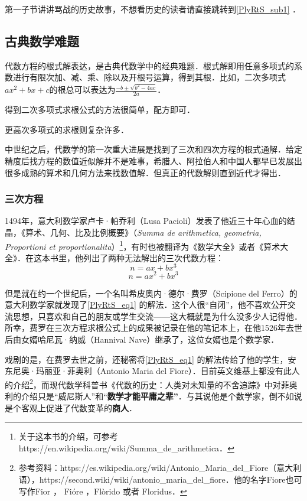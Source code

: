 


第一子节讲讲骂战的历史故事，不想看历史的读者请直接跳转到\autoref{PlyRtS_sub1} ．

\subsection{古典数学难题}

代数方程的根式解表达，是古典代数学中的经典难题．根式解即用任意多项式的系数进行有限次加、减、乘、除以及开根号运算，得到其根．比如，二次多项式$ax^2+bx+c$的根总可以表达为$\frac{-b\pm\sqrt{b^2-4ac}}{2a}$．

得到二次多项式求根公式的方法很简单，配方即可．

更高次多项式的求根则复杂许多．

中世纪之后，代数学的第一次重大进展是找到了三次和四次方程的根式通解．给定精度后找方程的数值近似解并不是难事，希腊人、阿拉伯人和中国人都早已发展出很多成熟的算术和几何方法来找数值解．但真正的代数解则直到近代才得出．

\subsubsection{三次方程}

1494年，意大利数学家卢卡·帕乔利（Lusa Pacioli）发表了他近三十年心血的结晶，《算术、几何、比及比例概要》（\textsl{Summa de arithmetica, geometria, Proportioni et proportionalita}）\footnote{关于这本书的介绍，可参考https://en.wikipedia.org/wiki/Summa_de_arithmetica．}，有时也被翻译为《数学大全》或者《算术大全》．在这本书里，他列出了两种无法解出的三次代数方程：
\begin{equation}\label{PlyRtS_eq1}
n=ax+bx^3
\end{equation}
\begin{equation}\label{PlyRtS_eq2}
n=ax^2+bx^3
\end{equation}

但是就在约一个世纪后，一个名叫希皮奥内·德尔·费罗（Scipione del Ferro）的意大利数学家就发现了\autoref{PlyRtS_eq1} 的解法．这个人很“自闭”，他不喜欢公开交流思想，只喜欢和自己的朋友或学生交流——这大概就是为什么没多少人记得他．所幸，费罗在三次方程求根公式上的成果被记录在他的笔记本上，在他1526年去世后由女婿哈尼瓦·纳威（Hannival Nave）继承了，这位女婿也是个数学家．

戏剧的是，在费罗去世之前，还秘密将\autoref{PlyRtS_eq1} 的解法传给了他的学生，安东尼奥·玛丽亚·菲奥利（Antonio Maria del Fiore）．目前英文维基上都没有此人的介绍\footnote{参考资料：https://es.wikipedia.org/wiki/Antonio_Maria_del_Fiore（意大利语），https://second.wiki/wiki/antonio_maria_del_fiore．他的名字Fiore也可写作Fior ， Fióre ，Flòrido 或者 Floridus．}，而现代数学科普书《代数的历史：人类对未知量的不舍追踪》中对菲奥利的介绍只是“威尼斯人”和“\textbf{数学才能平庸之辈”}．与其说他是个数学家，倒不如说是个客观上促进了代数变革的\textbf{商人}．

